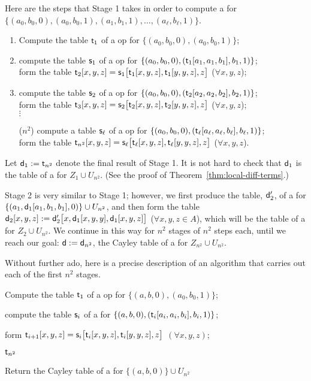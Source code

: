 Here are the steps that Stage 1 takes in order to compute a \ldto for
$\{(a_0, b_0,0),(a_0, b_0,1),(a_1, b_1,1), \dots, (a_{\ell}, b_{\ell},1)\}$.
\begin{enumerate}
  \item Compute the table $\mathsf{t}_1$ of a \ldt op for $\{(a_0, b_0, 0), (a_0, b_0, 1)\}$;\\[-8pt]
  \item compute the table $\mathsf{s}_1$ of a \ldt op for $\{(a_0, b_0, 0), (\mathsf{t}_1[a_1, a_1, b_1], b_1, 1)\}$; \\
  form the table $\mathsf{t}_2[x,y,z] = \mathsf{s}_1\bigl[\mathsf{t}_1[x,y,z], \mathsf{t}_1[y,y,z], z\bigr]$
  ($\forall x,y,z$); 
  \\[-8pt]
  \item compute the table $\mathsf{s}_2$ of a \ldt op for $\{(a_0, b_0, 0), (\mathsf{t}_2[a_2, a_2, b_2], b_2, 1)\}$; \\
    form the table $\mathsf{t}_3[x,y,z] = \mathsf{s}_2\bigl[\mathsf{t}_2[x,y,z], \mathsf{t}_2[y,y,z], z\bigr]$  ($\forall x,y,z$);\\
  $\vdots$
  \item[($n^2$)] compute a table $\mathsf{s}_{\ell}$ of a \ldt op for $\{(a_0, b_0, 0),  (\mathsf{t}_{\ell}[a_{\ell}, a_{\ell}, b_{\ell}], b_{\ell}, 1)\}$; \\
  form the table $\mathsf{t}_{n^2}[x,y,z] = \mathsf{s}_{\ell}\bigl[\mathsf{t}_{\ell}[x,y,z], \mathsf{t}_{\ell}[y,y,z], z\bigr]$
  ($\forall x,y,z$).
\end{enumerate}
Let $\mathsf{d}_1 := \mathsf{t}_{n^2}$ denote the final result of Stage 1. It is not hard to check that 
$\mathsf{d}_1$ is the table of a \ldto for $Z_1 \cup U_{n^2}$. (See the proof of Theorem~\ref{thm:local-diff-terms}.)

Stage 2 is very similar to Stage 1; however, we first produce the table, $\mathsf{d}'_2$, of a \ldto for 
$\{(a_1, \mathsf{d}_1[a_1, b_1, b_1], 0)\} \cup U_{n^2}$, and then form the table 
$\mathsf{d}_2[x,y,z] := \mathsf{d}'_2\bigl[x, \mathsf{d}_1[x,y,y], \mathsf{d}_1[x,y,z]\bigr]$ ($\forall x,y,z \in A$), 
which will be the table of a \ldto for $Z_2 \cup U_{n^2}$.
We continue in this way for $n^2$ stages of $n^2$ steps each, until we reach
our goal: $\mathsf{d}:=\mathsf{d}_{n^2}$, the Cayley table of 
a \ldto for $Z_{n^2} \cup U_{n^2}$.

Without further ado, here is a precise description of an algorithm that carries out each of the
first $n^2$ stages.
\begin{algorithm}

  Compute the table $\mathsf{t}_1$ of a \ldt op for $\{(a,b, 0), (a_0, b_0, 1)\}$; %

   {
    compute the table $\mathsf{s}_i$ of a \ldto for $\{(a,b, 0), (\mathsf{t}_i[a_i, a_i, b_i], b_i, 1)\}$;

    form $\mathsf{t}_{i+1}[x,y,z] = \mathsf{s}_i\bigl[\mathsf{t}_i[x,y,z], \mathsf{t}_i[y,y,z], z\bigr]$ $(\forall x,y,z)$;
  }

  \Return $\mathsf{t}_{n^2}$
  \caption{Return the Cayley table of a \ldto for $\{(a,b,0)\}\cup U_{n^2}$\label{alg:new-2-1}}
\end{algorithm}


